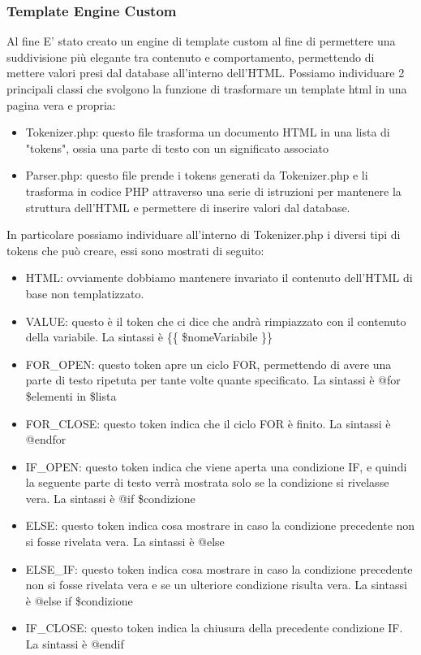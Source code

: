 \subsubsection{Template Engine Custom}
Al fine E' stato creato un engine di template custom al fine di permettere una suddivisione più elegante tra contenuto e comportamento, permettendo di mettere valori presi dal database all'interno dell'HTML.
Possiamo individuare 2 principali classi che svolgono la funzione di trasformare un template html in una pagina vera e propria:
\begin{itemize}
    \item Tokenizer.php: questo file trasforma un documento HTML in una lista di "tokens", ossia una parte di testo con un significato associato 
    \item Parser.php: questo file prende i tokens generati da Tokenizer.php e li trasforma in codice PHP attraverso una serie di istruzioni per mantenere la struttura dell'HTML e permettere di inserire valori dal database.
\end{itemize}

In particolare possiamo individuare all'interno di Tokenizer.php i diversi tipi di tokens che può creare, essi sono mostrati di seguito:
\begin{itemize}
    \item HTML: ovviamente dobbiamo mantenere invariato il contenuto dell'HTML di base non templatizzato.
    \item VALUE: questo è il token che ci dice che andrà rimpiazzato con il contenuto della variabile. La sintassi è \{\{ \$nomeVariabile \}\}
    \item FOR\_OPEN: questo token apre un ciclo FOR, permettendo di avere una parte di testo ripetuta per tante volte quante specificato. La sintassi è @for \$elementi in \$lista
    \item FOR\_CLOSE: questo token indica che il ciclo FOR è finito. La sintassi è @endfor
    \item IF\_OPEN: questo token indica che viene aperta una condizione IF, e quindi la seguente parte di testo verrà mostrata solo se la condizione si rivelasse vera. La sintassi è @if \$condizione
    \item ELSE: questo token indica cosa mostrare in caso la condizione precedente non si fosse rivelata vera. La sintassi è @else
    \item ELSE\_IF: questo token indica cosa mostrare in caso la condizione precedente non si fosse rivelata vera e se un ulteriore condizione risulta vera. La sintassi è @else if \$condizione
    \item IF\_CLOSE: questo token indica la chiusura della precedente condizione IF. La sintassi è @endif
\end{itemize}


